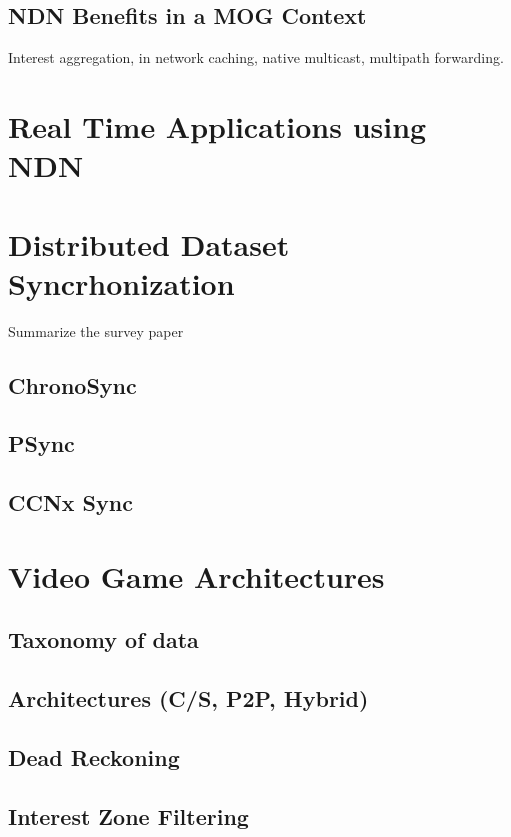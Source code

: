 \subsection{NDN Benefits in a MOG Context}
Interest aggregation, in network caching, native multicast, multipath forwarding.


\section{Real Time Applications using NDN}

\section{Distributed Dataset Syncrhonization}
Summarize the survey paper
\subsection{ChronoSync}
\subsection{PSync}
\subsection{CCNx Sync}

\section{Video Game Architectures}
\subsection{Taxonomy of data}
\subsection{Architectures (C/S, P2P, Hybrid)}
\subsection{Dead Reckoning}
\subsection{Interest Zone Filtering}


